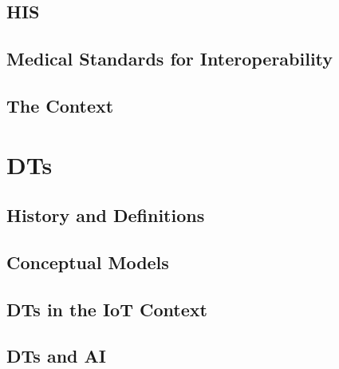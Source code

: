 \documentclass[12pt,a4paper,openright,twoside]{book}
\begin{document}
\section{\acl{HIS}}

\section{Medical Standards for Interoperability}

\section{The \ausl{} Context}

\chapter{\aclp{DT}}
\label{chap:back:DT}

\section{History and Definitions}

\section{Conceptual Models}

\section{\aclp{DT} in the \acs{IoT} Context}

\section{\aclp{DT} and \acl{AI}}
\end{document}
